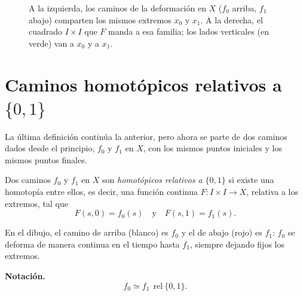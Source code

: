 \documentclass[11pt]{article}
\begin{document}
\begin{figure}[ht]
\centering
{}
\par\smallskip
\begin{minipage}{0.9\textwidth}\small\centering
A la izquierda, los caminos de la deformación en $X$ ($f_0$ arriba, $f_1$ abajo) comparten los mismos extremos $x_0$ y $x_1$. A la derecha, el cuadrado $I\times I$ que $F$ manda a esa familia; los lados verticales (en verde) van a $x_0$ y a $x_1$.
\end{minipage}
\end{figure}

\section*{Caminos homotópicos relativos a $\{0,1\}$}

La última definición continúa la anterior, pero ahora se parte de dos caminos dados desde el principio, $f_0$ y $f_1$ en $X$, con los mismos puntos iniciales y los mismos puntos finales.

\begin{defn}
Dos caminos $f_0$ y $f_1$ en $X$ son \emph{homotópicos relativos a $\{0,1\}$} si existe una homotopía entre ellos, es decir, una función continua $F\colon I\times I\to X$, relativa a los extremos, tal que
\[
  F(s,0)=f_0(s)\quad\text{y}\quad F(s,1)=f_1(s).
\]
\end{defn}

En el dibujo, el camino de arriba (blanco) es $f_0$ y el de abajo (rojo) es $f_1$: $f_0$ se deforma de manera continua en el tiempo hasta $f_1$, siempre dejando fijos los extremos.

\medskip\noindent\textbf{Notación.}
\[
  f_0\simeq f_1\ \ \mathrm{rel}\ \{0,1\}.
\]
\end{document}
